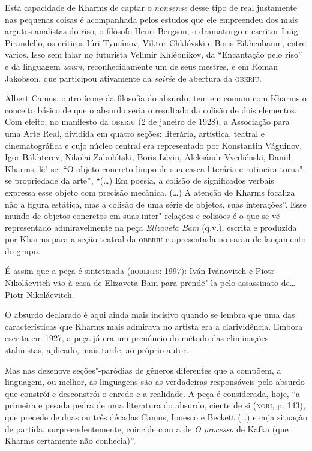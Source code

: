 Esta capacidade de Kharms de captar o \emph{nonsense} desse tipo de real
justamente nas pequenas coisas é acompanhada pelos estudos que ele
empreendeu dos mais argutos analistas do riso, o filósofo Henri Bergson,
o dramaturgo e escritor Luigi Pirandello, os críticos Iúri Tyniánov,
Viktor Chklóvski e Boris Eikhenbaum, entre vários. Isso sem falar no
futurista Velimir Khlébnikov, da ``Encantação pelo riso'' e da linguagem
\emph{zaum}, reconhecidamente um de seus mestres, e em Roman Jakobson,
que participou ativamente da \emph{soirée} de abertura da
\textsc{oberiu}.

Albert Camus, outro ícone da filosofia do absurdo, tem em comum com
Kharms o conceito básico de que o absurdo seria o resultado da colisão
de dois elementos. Com efeito, no manifesto da \textsc{oberiu} (2 de
janeiro de 1928), a Associação para uma Arte Real, dividida em quatro
seções: literária, artística, teatral e cinematográfica e cujo núcleo
central era representado por Konstantin Váguinov, Igor Bákhterev,
Nikolai Zabolótski, Boris Lévin, Aleksándr Vvediénski, Daniil Kharms, lê"-se: ``O objeto concreto limpo de sua casca literária e rotineira
torna"-se propriedade da arte'', ``(\ldots{}) Em poesia, a colisão de
significados verbais expressa esse objeto com precisão mecânica.
(\ldots{}) A atenção de Kharms focaliza não a figura estática, mas a
colisão de uma série de objetos, suas interações''. Esse mundo de
objetos concretos em suas inter"-relações e colisões é o que se vê
representado admiravelmente na peça \emph{Elizaveta Bam} (q.v.), escrita
e produzida por Kharms para a seção teatral da \textsc{oberiu} e
apresentada no sarau de lançamento do grupo.

É assim que a peça é sintetizada (\textsc{roberts}: 1997): Iván
Ivánovitch e Piotr Nikoláevitch vão à casa de Elizaveta Bam para
prendê"-la pelo assassinato de\ldots{} Piotr Nikoláevitch.

O absurdo declarado é aqui ainda mais incisivo quando se lembra que uma
das características que Kharms mais admirava no artista era a
clarividência. Embora escrita em 1927, a peça já era um prenúncio do
método das eliminações stalinistas, aplicado, mais tarde, ao próprio
autor.

Mas nas dezenove seções"-paródias de gêneros diferentes que a compõem, a
linguagem, ou melhor, as linguagens são as verdadeiras responsáveis pelo
absurdo que constrói e desconstrói o enredo e a realidade. A peça é
considerada, hoje, ``a primeira e pesada pedra de uma literatura do
absurdo, ciente de si (\textsc{nori}, p. 143), que precede de duas ou
três décadas Camus, Ionesco e Beckett (\ldots{}) e cuja situação de
partida, surpreendentemente, coincide com a de \emph{O processo}
de Kafka (que Kharms certamente não conhecia)''.

